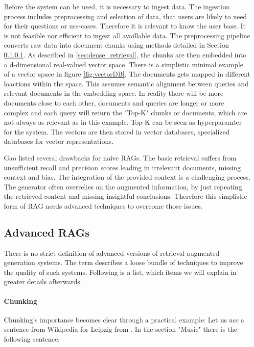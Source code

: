 Before the system can be used, it is necessary to ingest data. The ingestion process includes preprocessing and selection of data, that users are likely to need for their questions or use-cases. Therefore it is relevant to know the user base. It is not feasible nor efficient to ingest all availlable data. The preprocessing pipeline converts raw data into document chunks using methods detailed in Section \ref{sec:chunk}. As described in \ref{sec:dense_retrieval}, the chunks are then embedded into a d-dimensional real-valued vector space. There is a simplistic minimal example of a vector space in figure \ref{fig:vectorDB}. The documents gets mapped in different loactions within the space. This assumes semantic alignment between queries and relevant documents in the embedding space. In reality there will be more documents close to each other, documents and queries are longer or more complex and each query will return the "Top-K" chunks or documents, which are not always as relevant as in this example. Top-K can be seen as hyperparamter for the system. The vectors are then stored in vector databases, specialized databases for vector representations.


Gao \cite{Gao.18.12.2023} listed several drawbacks for naive RAGs. The basic retrieval suffers from unsufficient recall and precision scores leading in irrelevant documents, missing context and bias. The integration of the provided context is a challenging process. The generator often overrelies on the augmented information, by just repeating the retrieved content and missing insightful conclusions. Therefore this simplistic form of RAG needs advanced techniques to overcome those issues. 

\subsection{Advanced RAGs}
\label{sec:advanced_rags}

There is no strict definition of advanced versions of retrieval-augmented generation systems. The term describes a loose bundle of techniques to improve the quality of such systems. Following is a list, which items we will explain in greater details afterwards.

\paragraph{Chunking}
\label{sec:chunk}
Chunking's importance becomes clear through a practical example: Let us use a sentence from Wikipedia \cite{LeipzigWikipedia.2025} for Leipzig from \citeyear{LeipzigWikipedia.2025}. In the section "Music" there is the following sentence. 

